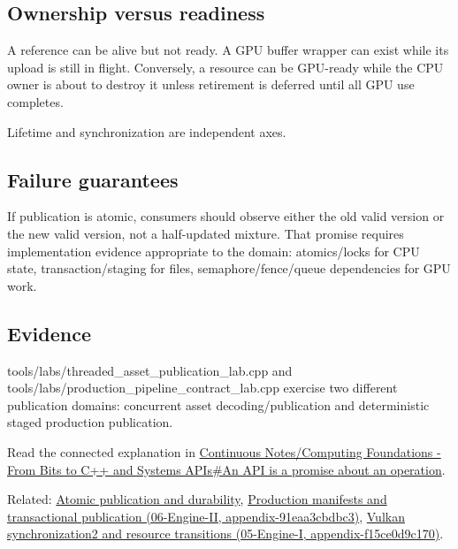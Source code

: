 \subsection{Ownership versus readiness}\label{appendix-fdae7ff0a23f-ownership-versus-readiness}

A reference can be alive but not ready. A GPU buffer wrapper can exist while its upload is still in flight. Conversely, a resource can be GPU-ready while the CPU owner is about to destroy it unless retirement is deferred until all GPU use completes.

Lifetime and synchronization are independent axes.

\subsection{Failure guarantees}\label{appendix-fdae7ff0a23f-failure-guarantees}

If publication is atomic, consumers should observe either the old valid version or the new valid version, not a half-updated mixture. That promise requires implementation evidence appropriate to the domain: atomics/locks for CPU state, transaction/staging for files, semaphore/fence/queue dependencies for GPU work.

\subsection{Evidence}\label{appendix-fdae7ff0a23f-evidence}

tools/labs/threaded\_asset\_publication\_lab.cpp and tools/labs/production\_pipeline\_contract\_lab.cpp exercise two different publication domains: concurrent asset decoding/publication and deterministic staged production publication.

Read the connected explanation in \hyperref[01-foundations-i-ch008-an-api-is-a-promise-about-an-operation]{Continuous Notes/Computing Foundations - From Bits to C++ and Systems APIs\#An API is a promise about an operation}.

Related: \hyperref[appendix-e89a8f290ef5]{Atomic publication and durability}, \href{../06-Engine-II/main.pdf\#nameddest=appendix-91eaa3cbdbc3}{Production manifests and transactional publication (06-Engine-II, appendix-91eaa3cbdbc3)}, \href{../05-Engine-I/main.pdf\#nameddest=appendix-f15ce0d9c170}{Vulkan synchronization2 and resource transitions (05-Engine-I, appendix-f15ce0d9c170)}.
